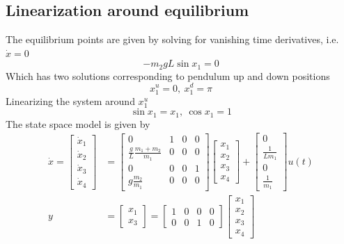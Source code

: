 \documentclass[12pt]{article}
\numberwithin{equation}{section}
\begin{document}
\subsection{Linearization around equilibrium}

The equilibrium points are given by solving for vanishing time derivatives, i.e. $\dot{x} = 0$
\begin{equation}
    - m_2 g L \sin x_1 = 0
\end{equation}
Which has two solutions corresponding to pendulum up and down positions
\begin{equation}
    x_1^u = 0,\ x_1^d = \pi 
\end{equation}
Linearizing the system around $x_1^u$
\begin{equation}
    \sin x_1 = x_1,\ \cos x_1 = 1 
\end{equation}
The state space model is given by
\begin{align}
    \dot{x}
    =
    \begin{bmatrix}
        \dot{x}_1\\
        \dot{x}_2\\
        \dot{x}_3\\
        \dot{x}_4
    \end{bmatrix}
    &=
    \begin{bmatrix}
        0 & 1 & 0 & 0\\
        \frac{g}{L} \frac{m_1 + m_2}{m_1} & 0 & 0 & 0\\
        0 & 0 & 0 & 1\\
        g \frac{m_2}{m_1} & 0 & 0 & 0
    \end{bmatrix}
    \begin{bmatrix}
        x_1\\
        x_2\\
        x_3\\
        x_4
    \end{bmatrix}
    +
    \begin{bmatrix}
        0\\
        \frac{1}{L m_1}\\
        0\\
        \frac{1}{m_1}
    \end{bmatrix}
    u(t)\\
    y
    &=
    \begin{bmatrix}
        x_1\\
        x_3
    \end{bmatrix}
    =
    \begin{bmatrix}
        1 & 0 & 0 & 0\\
        0 & 0 & 1 & 0
    \end{bmatrix}
    \begin{bmatrix}
        x_1\\
        x_2\\
        x_3\\
        x_4
    \end{bmatrix}
\end{align}
\end{document}
